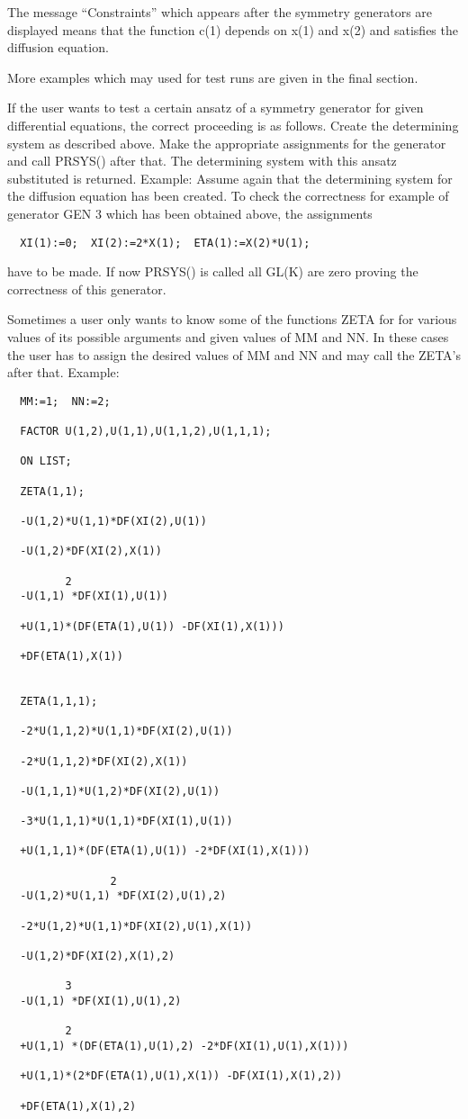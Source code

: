 The message ``Constraints'' which appears after the symmetry generators
are displayed means that the function c(1) depends on x(1) and x(2)
and satisfies the diffusion equation.

More examples which may used for test runs are given in the final
section.

If the user wants to test a certain ansatz of a symmetry generator for
given differential equations, the correct proceeding is as follows.
Create the determining system as described above. Make the appropriate
assignments for the generator and call PRSYS() after that.  The
determining system with this ansatz substituted is returned.  Example:
Assume again that the determining system for the diffusion equation
has been created. To check the correctness for example of generator GEN
3 which has been obtained above, the assignments

\begin{verbatim}
  XI(1):=0;  XI(2):=2*X(1);  ETA(1):=X(2)*U(1);
\end{verbatim}

have to be made. If now PRSYS() is called all GL(K) are zero
proving the correctness of this generator.

Sometimes a user only wants to know some of the functions ZETA for for
various values of its possible arguments and given values of MM and
NN. In these cases the user has to assign the desired values of MM and
NN and may call the ZETA's after that. Example:

\begin{verbatim}
  MM:=1;  NN:=2;

  FACTOR U(1,2),U(1,1),U(1,1,2),U(1,1,1);

  ON LIST;

  ZETA(1,1);

  -U(1,2)*U(1,1)*DF(XI(2),U(1))

  -U(1,2)*DF(XI(2),X(1))

         2
  -U(1,1) *DF(XI(1),U(1))

  +U(1,1)*(DF(ETA(1),U(1)) -DF(XI(1),X(1)))

  +DF(ETA(1),X(1))


  ZETA(1,1,1);

  -2*U(1,1,2)*U(1,1)*DF(XI(2),U(1))

  -2*U(1,1,2)*DF(XI(2),X(1))

  -U(1,1,1)*U(1,2)*DF(XI(2),U(1))

  -3*U(1,1,1)*U(1,1)*DF(XI(1),U(1))

  +U(1,1,1)*(DF(ETA(1),U(1)) -2*DF(XI(1),X(1)))

                2
  -U(1,2)*U(1,1) *DF(XI(2),U(1),2)

  -2*U(1,2)*U(1,1)*DF(XI(2),U(1),X(1))

  -U(1,2)*DF(XI(2),X(1),2)

         3
  -U(1,1) *DF(XI(1),U(1),2)

         2
  +U(1,1) *(DF(ETA(1),U(1),2) -2*DF(XI(1),U(1),X(1)))

  +U(1,1)*(2*DF(ETA(1),U(1),X(1)) -DF(XI(1),X(1),2))

  +DF(ETA(1),X(1),2)
\end{verbatim}

